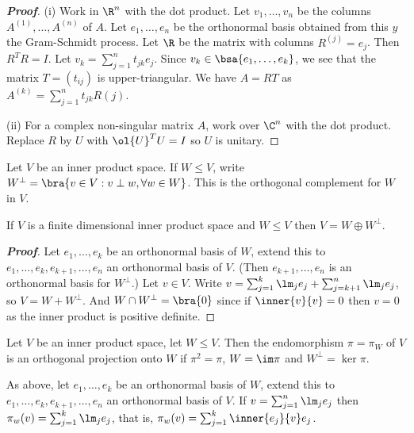 \begin{proof}[\bf Proof]
\ben
\item [(i)] Work in $\R^n$ with the dot product. Let $v_1, \dots, v_n$ be the columns $A^{(1)}, \dots, A^{(n)}$ of $A$. Let $e_1, \dots, e_n$ be the orthonormal basis obtained from this $y$ the Gram-Schmidt process. Let $\R$ be the matrix with columns $R^{(j)} = e_j$. Then $R^TR = I$. Let $v_k = \sum^n_{j=1} t_{jk}e_j$. Since $v_k \in \bsa{e_1, \dots, e_k}$, we see that the matrix $T = (t_{ij})$ is upper-triangular. We have $A = RT$ as $A^{(k)} = \sum^n_{j=1} t_{jk}R(j)$.
\item [(ii)] For a complex non-singular matrix $A$, work over $\C^n$ with the dot product. Replace $R$ by $U$ with $\ol{U}^TU = I$ so $U$ is unitary.
\een
\end{proof}

\begin{definition}
Let $V$ be an inner product space. If $W \leq V$, write $W^\perp = \bra{v \in V : v \perp w,\forall w \in W}$. This is the orthogonal complement for $W$ in $V$.
\end{definition}

\begin{theorem}
If $V$ is a finite dimensional inner product space and $W \leq V$ then $V = W \oplus W^\perp$.
\end{theorem}

\begin{proof}[\bf Proof]
Let $e_1, \dots, e_k$ be an orthonormal basis of $W$, extend this to $e_1, \dots, e_k, e_{k+1}, \dots, e_n$ an orthonormal basis of $V$. (Then $e_{k+1}, \dots, e_n$ is an orthonormal basis for $W^\perp$.) Let $v \in V$. Write $v = \sum^k_{j=1} \lm_je_j + \sum^n_{j=k+1} \lm_je_j$, so $V = W + W^\perp$. And $W \cap W^\perp = \bra{0}$ since if $\inner{v}{v} = 0$ then $v = 0$ as the inner product is positive definite.
\end{proof}

\begin{definition}
Let $V$ be an inner product space, let $W \leq V$. Then the endomorphism $\pi = \pi_W$ of $V$ is an orthogonal projection onto $W$ if $\pi^2 = \pi$, $W = \im \pi$ and $W^\perp = \ker \pi$. 

As above, let $e_1, \dots, e_k$ be an orthonormal basis of $W$, extend this to $e_1, \dots, e_k, e_{k+1}, \dots, e_n$ an orthonormal basis of $V$. If $v =
\sum^n_{j=1} \lm_je_j$ then $\pi_w(v) = \sum^k_{j=1} \lm_je_j$, that is, $\pi_w(v) = \sum^k_{j=1} \inner{e_j}{v} e_j$.
\end{definition}

